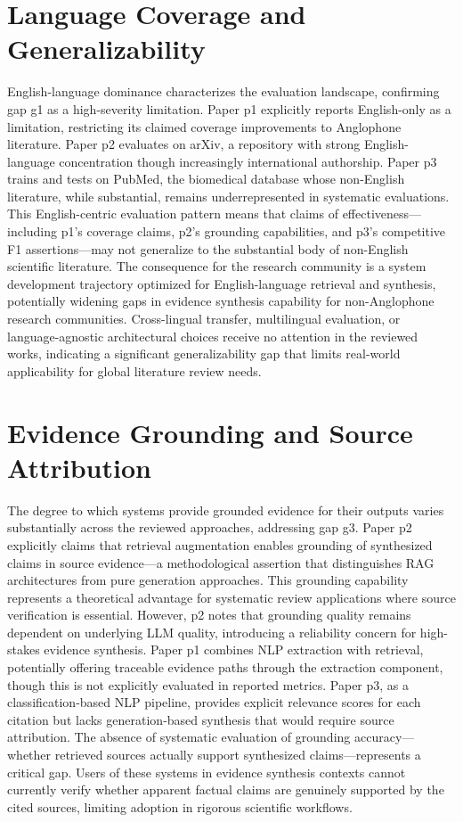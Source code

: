 \documentclass{article}
\begin{document}
\section{Language Coverage and Generalizability}
English-language dominance characterizes the evaluation landscape, confirming gap g1 as a high-severity limitation. Paper p1 explicitly reports English-only as a limitation, restricting its claimed coverage improvements to Anglophone literature. Paper p2 evaluates on arXiv, a repository with strong English-language concentration though increasingly international authorship. Paper p3 trains and tests on PubMed, the biomedical database whose non-English literature, while substantial, remains underrepresented in systematic evaluations. This English-centric evaluation pattern means that claims of effectiveness—including p1's coverage claims, p2's grounding capabilities, and p3's competitive F1 assertions—may not generalize to the substantial body of non-English scientific literature. The consequence for the research community is a system development trajectory optimized for English-language retrieval and synthesis, potentially widening gaps in evidence synthesis capability for non-Anglophone research communities. Cross-lingual transfer, multilingual evaluation, or language-agnostic architectural choices receive no attention in the reviewed works, indicating a significant generalizability gap that limits real-world applicability for global literature review needs.

\section{Evidence Grounding and Source Attribution}
The degree to which systems provide grounded evidence for their outputs varies substantially across the reviewed approaches, addressing gap g3. Paper p2 explicitly claims that retrieval augmentation enables grounding of synthesized claims in source evidence—a methodological assertion that distinguishes RAG architectures from pure generation approaches. This grounding capability represents a theoretical advantage for systematic review applications where source verification is essential. However, p2 notes that grounding quality remains dependent on underlying LLM quality, introducing a reliability concern for high-stakes evidence synthesis. Paper p1 combines NLP extraction with retrieval, potentially offering traceable evidence paths through the extraction component, though this is not explicitly evaluated in reported metrics. Paper p3, as a classification-based NLP pipeline, provides explicit relevance scores for each citation but lacks generation-based synthesis that would require source attribution. The absence of systematic evaluation of grounding accuracy—whether retrieved sources actually support synthesized claims—represents a critical gap. Users of these systems in evidence synthesis contexts cannot currently verify whether apparent factual claims are genuinely supported by the cited sources, limiting adoption in rigorous scientific workflows.
\end{document}
